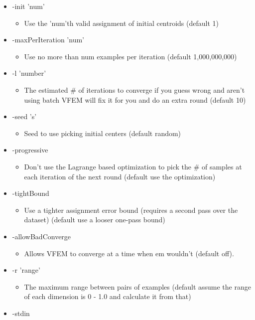 \begin{itemize}
\item -init 'num'\begin{itemize}
\item Use the 'num'th valid assignment of initial centroids (default 1)\end{itemize}
\item -max\-Per\-Iteration 'num'\begin{itemize}
\item Use no more than num examples per iteration (default 1,000,000,000)\end{itemize}
\item -l 'number'\begin{itemize}
\item The estimated \# of iterations to converge if you guess wrong and aren't using batch VFEM will fix it for you and do an extra round (default 10)\end{itemize}
\item -seed 's'\begin{itemize}
\item Seed to use picking initial centers (default random)\end{itemize}
\item -progressive\begin{itemize}
\item Don't use the Lagrange based optimization to pick the \# of samples at each iteration of the next round (default use the optimization)\end{itemize}
\item -tight\-Bound\begin{itemize}
\item Use a tighter assignment error bound (requires a second pass over the dataset) (default use a looser one-pass bound)\end{itemize}
\item -allow\-Bad\-Converge\begin{itemize}
\item Allows VFEM to converge at a time when em wouldn't (default off).\end{itemize}
\item -r 'range'\begin{itemize}
\item The maximum range between pairs of examples (default assume the range of each dimension is 0 - 1.0 and calculate it from that)\end{itemize}
\item -stdin\begin{itemize}

\end{itemize}
\end{itemize}

